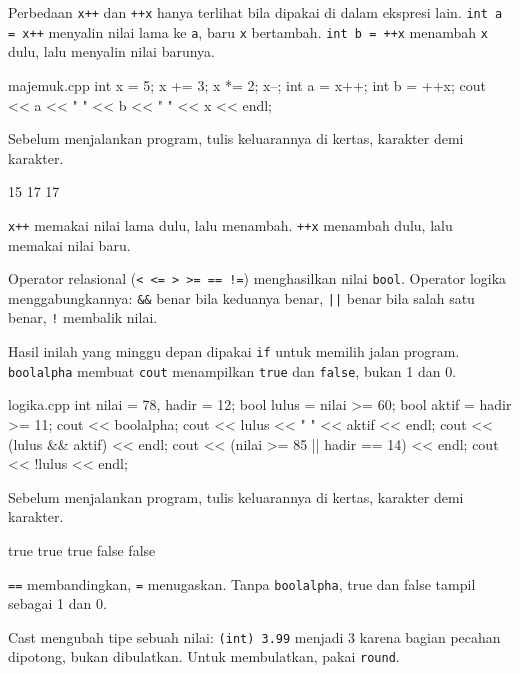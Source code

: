 \documentclass[a4paper]{article}
\begin{document}
Perbedaan \texttt{x++} dan \texttt{++x} hanya terlihat bila dipakai di dalam ekspresi lain. \texttt{int a = x++} menyalin nilai lama ke \texttt{a}, baru \texttt{x} bertambah. \texttt{int b = ++x} menambah \texttt{x} dulu, lalu menyalin nilai barunya.

\begin{MKode}{majemuk.cpp}
int x = 5;
x += 3;
x *= 2;
x--;
int a = x++;
int b = ++x;
cout << a << " " << b << " " << x << endl;
\end{MKode}
\begin{Tebak}[]
Sebelum menjalankan program, tulis keluarannya di kertas, karakter demi karakter.
\end{Tebak}
\begin{Jawaban}[]
\begin{MKeluaran}[]
15 17 17
\end{MKeluaran}
\texttt{x++} memakai nilai lama dulu, lalu menambah. \texttt{++x} menambah dulu, lalu memakai nilai baru.
\end{Jawaban}
Operator relasional (\texttt{< <= > >= == !=}) menghasilkan nilai \texttt{bool}. Operator logika menggabungkannya: \texttt{\&\&} benar bila keduanya benar, \texttt{||} benar bila salah satu benar, \texttt{!} membalik nilai.

Hasil inilah yang minggu depan dipakai \texttt{if} untuk memilih jalan program. \texttt{boolalpha} membuat \texttt{cout} menampilkan \texttt{true} dan \texttt{false}, bukan 1 dan 0.

\begin{MKode}{logika.cpp}
int nilai = 78, hadir = 12;
bool lulus = nilai >= 60;
bool aktif = hadir >= 11;
cout << boolalpha;
cout << lulus << " " << aktif << endl;
cout << (lulus && aktif) << endl;
cout << (nilai >= 85 || hadir == 14) << endl;
cout << !lulus << endl;
\end{MKode}
\begin{Tebak}[]
Sebelum menjalankan program, tulis keluarannya di kertas, karakter demi karakter.
\end{Tebak}
\begin{Jawaban}[]
\begin{MKeluaran}[]
true true
true
false
false
\end{MKeluaran}
\texttt{==} membandingkan, \texttt{=} menugaskan. Tanpa \texttt{boolalpha}, true dan false tampil sebagai 1 dan 0.
\end{Jawaban}
Cast mengubah tipe sebuah nilai: \texttt{(int) 3.99} menjadi 3 karena bagian pecahan dipotong, bukan dibulatkan. Untuk membulatkan, pakai \texttt{round}.
\end{document}

